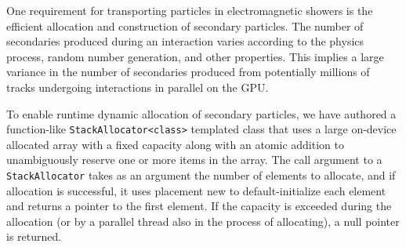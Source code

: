 One requirement for transporting particles in electromagnetic showers is
the efficient allocation and construction of secondary particles. The
number of secondaries produced during an interaction varies according to
the physics process, random number generation, and other properties.
This implies a large variance in the number of secondaries produced from
potentially millions of tracks undergoing interactions in parallel on
the GPU.

To enable runtime dynamic allocation of secondary particles, we have
authored a function-like
\texttt{StackAllocator\textless{}class\textgreater{}} templated class
that uses a large on-device allocated array with a fixed capacity along
with an atomic addition to unambiguously reserve one or more items in
the array. The call argument to a \texttt{StackAllocator} takes as an
argument the number of elements to allocate, and if allocation is
successful, it uses placement new to default-initialize each element and
returns a pointer to the first element. If the capacity is exceeded
during the allocation (or by a parallel thread also in the process of
allocating), a null pointer is returned.

